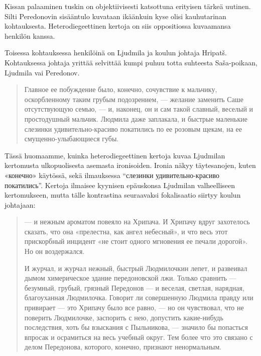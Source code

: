 \documentclass[12pt,a4paper]{article}
\begin{document}
Kissan palaaminen tuskin on objektiivisesti katsottuna erityisen tärkeä uutinen.
Silti Peredonovin sisääntulo kuvataan ikäänkuin kyse olisi kauhutarinan 
kohtauksesta. Heterodiegeettinen kertoja on siis oppositiossa kuvaamansa henkilön kanssa.

Toisessa kohtauksessa henkilöinä on Ljudmila ja koulun johtaja Hripatš. Kohtauksessa johtaja yrittää selvittää kumpi puhuu totta suhteesta Saša-poikaan, Ljudmila vai Peredonov.

\begin{quote}
Главное ее побуждение было,
конечно, сочувствие к мальчику, оскорбленному таким грубым 
подозрением, — желание заменить Саше отсутствующую семью, — и, 
наконец, он и сам такой славный, веселый и простодушный мальчик. 
Людмила даже заплакала, и быстрые маленькие слезинки 
удивительно-красиво покатились по ее розовым щекам, на ее смущенно-улыбающиеся
губы. \parencite[239]{sologub2004}
\end{quote}

Tässä huomaamme, kuinka heterodiegeettinen kertoja kuvaa Ljudmilan kertomusta ulkopuolisesta asemasta ironisoiden. Ironia näkyy täytesanojen,  kuten «конечно» käytössä, sekä ilmauksessa \enquote{слезинки 
удивительно-красиво покатились}. Kertoja ilmaisee kyynisen epäuskonsa Ljudmilan valheelliseen kertomukseen, mutta tälle kontrastina seuraavaksi fokalisaatio siirtyy koulun johtajaan:

\begin{quote}

— и нежным ароматом повеяло на Хрипача. И Хрипачу
вдруг захотелось сказать, что она «прелестна, как ангел небесный», и
что весь этот прискорбный инцидент «не стоит одного мгновения ее 
печали дорогой». Но он воздержался.

И журчал, и журчал нежный, быстрый Людмилочкин лепет, и 
развеивал дымом химерическое здание передоновской лжи. Только 
сравнить — безумный, грубый, грязный Передонов — и веселая, светлая,
нарядная, благоуханная Людмилочка. Говорит ли совершенную 
Людмила правду или привирает — это Хрипачу было все равно, — но он 
чувствовал, что не поверить Людмилочке, заспорить с нею, допустить 
какие-нибудь последствия, хоть бы взыскания с Пыльникова, — значило
бы попасться впросак и осрамиться на весь учебный округ. Тем более
что это связано с делом Передонова, которого, конечно, признают 
ненормальным. \parencite[240]{sologub2004}
\end{quote}
\end{document}

